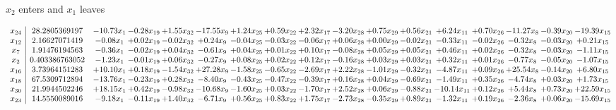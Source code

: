 \documentclass[9pt]{article}
\begin{document}
 $ x_{2} $ enters and $ x_{1} $ leaves 

 \[\begin{array}{c| c c@{\hskip 2pt} c@{\hskip 2pt} c@{\hskip 2pt} c@{\hskip 2pt} c@{\hskip 2pt} c@{\hskip 2pt} c@{\hskip 2pt} c@{\hskip 2pt} c@{\hskip 2pt} c@{\hskip 2pt} c@{\hskip 2pt} c@{\hskip 2pt} c@{\hskip 2pt} c@{\hskip 2pt} c@{\hskip 2pt} }
 x_{24}   &  28.2805369197 & -10.73 x_{1} & -0.28 x_{19} & +  1.55 x_{32} & -17.55 x_{9} & +  1.24 x_{25} & +  0.59 x_{22} & +  2.32 x_{17} & -3.20 x_{28} & +  0.75 x_{29} & +  0.56 x_{21} & +  6.24 x_{11} & +  0.70 x_{26} & -11.27 x_{8} & -0.39 x_{20} & -19.39 x_{15}\\
 x_{12}   &  2.16627071419 & -0.08 x_{1} & +  0.02 x_{19} & -0.02 x_{32} & +  0.24 x_{9} & -0.04 x_{25} & -0.03 x_{22} & -0.06 x_{17} & +  0.06 x_{28} & +  0.00 x_{29} & -0.02 x_{21} & -0.33 x_{11} & -0.02 x_{26} & -0.32 x_{8} & -0.03 x_{20} & +  0.21 x_{15}\\
 x_{7}   &  1.91476194563 & -0.36 x_{1} & -0.02 x_{19} & +  0.04 x_{32} & -0.61 x_{9} & +  0.04 x_{25} & +  0.01 x_{22} & +  0.10 x_{17} & -0.08 x_{28} & +  0.05 x_{29} & +  0.05 x_{21} & +  0.46 x_{11} & +  0.02 x_{26} & -0.32 x_{8} & -0.03 x_{20} & -1.11 x_{15}\\
 x_{2}   &  0.403386763052 & -1.23 x_{1} & -0.01 x_{19} & +  0.06 x_{32} & -0.27 x_{9} & +  0.08 x_{25} & +  0.02 x_{22} & +  0.12 x_{17} & -0.16 x_{28} & +  0.03 x_{29} & +  0.03 x_{21} & +  0.32 x_{11} & +  0.01 x_{26} & -0.77 x_{8} & -0.05 x_{20} & -1.07 x_{15}\\
 x_{16}   &  3.73964151283 & + 10.10 x_{1} & +  0.18 x_{19} & -1.54 x_{32} & + 27.28 x_{9} & -1.58 x_{25} & -0.65 x_{22} & -2.69 x_{17} & +  2.22 x_{28} & -1.01 x_{29} & -0.32 x_{21} & -4.87 x_{11} & +  0.09 x_{26} & + 25.54 x_{8} & -0.14 x_{20} & +  6.80 x_{15}\\
 x_{18}   &  67.5309712894 & -13.76 x_{1} & -0.23 x_{19} & +  0.28 x_{32} & -8.40 x_{9} & -0.43 x_{25} & -0.47 x_{22} & -0.39 x_{17} & +  0.16 x_{28} & +  0.04 x_{29} & -0.69 x_{21} & -1.49 x_{11} & +  0.35 x_{26} & -4.74 x_{8} & +  0.03 x_{20} & +  1.73 x_{15}\\
 x_{30}   &  21.9944502246 & + 18.15 x_{1} & +  0.42 x_{19} & -0.98 x_{32} & -10.68 x_{9} & -1.60 x_{25} & +  0.03 x_{22} & -1.70 x_{17} & +  2.52 x_{28} & +  0.06 x_{29} & -0.88 x_{21} & -10.14 x_{11} & +  0.12 x_{26} & +  5.44 x_{8} & +  0.73 x_{20} & + 22.59 x_{15}\\
 x_{23}   &  14.5550089016 & -9.18 x_{1} & -0.11 x_{19} & +  1.40 x_{32} & -6.71 x_{9} & +  0.56 x_{25} & +  0.83 x_{22} & +  1.75 x_{17} & -2.73 x_{28} & -0.35 x_{29} & +  0.89 x_{21} & -1.32 x_{11} & +  0.19 x_{26} & -2.36 x_{8} & +  0.06 x_{20} & -15.69 x_{15}\\

\end{array}\]
\end{document}
